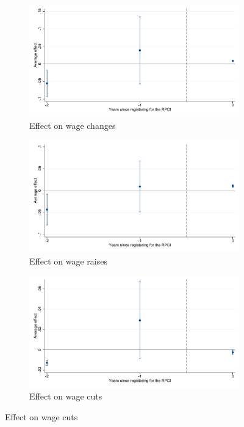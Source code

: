 \documentclass[oneside,11pt]{article}
\begin{document}
\begin{figure}[H]
    \centering
    \caption{Event studies - RPCI effect on wage changes \label{fig:event_study_wage_changes_rpci}}
    
    \begin{subfigure}{0.49\textwidth}
    \caption{Effect on wage changes}
    \includegraphics[width=\textwidth]{04_Figures/muestra_10porciento/event_study_sal_diff_yr_dcdh.pdf}
    \end{subfigure}
    
    \begin{subfigure}{0.49\textwidth}
    \caption{Effect on wage raises}
    \includegraphics[width=\textwidth]{04_Figures/muestra_10porciento/event_study_sal_mayor_yr_dcdh.pdf}
    \end{subfigure}
    \begin{subfigure}{0.49\textwidth}
    \caption{Effect on wage cuts}
    \includegraphics[width=\textwidth]{04_Figures/muestra_10porciento/event_study_sal_menor_yr_dcdh.pdf}
    \end{subfigure}
    
\end{figure}
\end{document}
